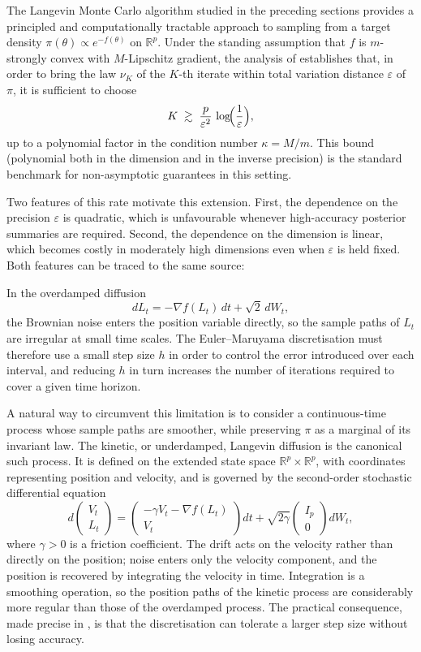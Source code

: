 \documentclass[a4paper,11pt, titlepage]{article}
\theoremstyle{definition}
\theoremstyle{plain}
\theoremstyle{remark}
\begin{document}
The Langevin Monte Carlo algorithm studied in the preceding sections provides
a principled and computationally tractable approach to sampling from a target
density $\pi(\theta) \propto e^{-f(\theta)}$ on $\mathbb{R}^p$. Under the standing
assumption that $f$ is $m$-strongly convex with $M$-Lipschitz gradient, the
analysis of \citet{Dalalyan2017} establishes that, in order to bring the law
$\nu_K$ of the $K$-th iterate within total variation distance $\varepsilon$ of
$\pi$, it is sufficient to choose
\[
K \;\gtrsim\; \frac{p}{\varepsilon^2}\,\log\!\Bigl(\frac{1}{\varepsilon}\Bigr),
\]
up to a polynomial factor in the condition number $\kappa = M/m$. This bound
(polynomial both in the dimension and in the inverse precision) is the standard benchmark for non-asymptotic guarantees in this setting.

Two features of this rate motivate this extension. First, the
dependence on the precision $\varepsilon$ is quadratic, which is unfavourable
whenever high-accuracy posterior summaries are required. Second, the
dependence on the dimension is linear, which becomes costly in
moderately high dimensions even when $\varepsilon$ is held fixed. Both
features can be traced to the same source:


In the overdamped diffusion
\[
dL_t = -\nabla f(L_t)\,dt + \sqrt{2}\,dW_t,
\]
the Brownian noise enters the position variable directly, so the sample paths
of $L_t$ are irregular at small time scales. The Euler--Maruyama
discretisation must therefore use a small step size $h$ in order to control
the error introduced over each interval, and reducing $h$ in turn increases
the number of iterations required to cover a given time horizon.

A natural way to circumvent this limitation is to consider a continuous-time
process whose sample paths are smoother, while preserving $\pi$ as a marginal
of its invariant law. The kinetic, or underdamped, Langevin diffusion is
the canonical such process. It is defined on the extended state space
$\mathbb{R}^p \times \mathbb{R}^p$, with coordinates representing position
and velocity, and is governed by the second-order stochastic differential
equation
\[
d\!\begin{pmatrix} V_t \\ L_t \end{pmatrix}
=
\begin{pmatrix} -\gamma V_t - \nabla f(L_t) \\ V_t \end{pmatrix} dt
+
\sqrt{2\gamma}\begin{pmatrix} I_p \\ 0 \end{pmatrix} dW_t,
\]
where $\gamma > 0$ is a friction coefficient. The drift acts on the velocity
rather than directly on the position; noise enters only the velocity component, and the position is recovered by integrating the velocity in time. Integration is
a smoothing operation, so the position paths of the kinetic process are
considerably more regular than those of the overdamped process. The
practical consequence, made precise in \citet{DalalyanRiouDurand2020}, is
that the discretisation can tolerate a larger step size without losing
accuracy.
\end{document}
